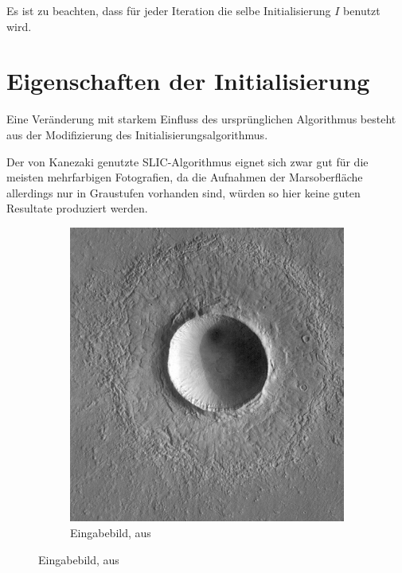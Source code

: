 Es ist zu beachten, dass für jeder Iteration die selbe Initialisierung $I$ benutzt wird.

\section{Eigenschaften der Initialisierung}
\label{sec:initialization}

Eine Veränderung mit starkem Einfluss des ursprünglichen Algorithmus besteht aus der Modifizierung des Initialisierungsalgorithmus.

Der von Kanezaki \etal genutzte SLIC-Algorithmus eignet sich zwar gut für die meisten mehrfarbigen Fotografien, da die Aufnahmen der Marsoberfläche allerdings nur in Graustufen vorhanden sind, würden so hier keine guten Resultate produziert werden.

\begin{figure}[h!]
	\centering
	\begin{subfigure}[t]{0.32\textwidth}
		\centering
		\includegraphics[width=\textwidth,keepaspectratio]{images/Gre13/Gre13_01.jpg}
		\captionsetup{format=plain,width=0.85\textwidth}
		\caption{Eingabebild, aus \cite[Kap.~7]{greeley_13}}
		\label{fig:slic_vs_tsugf_in}
	\end{subfigure}

\end{figure}
